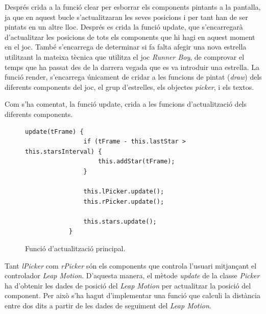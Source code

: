 \documentclass[12pt,a4paper,catalan]{article}
\begin{document}
	Després crida a la funció clear per esborrar els components pintants a la pantalla, ja que en aquest bucle s'actualitzaran les seves posicions i per tant han de ser pintats en un altre lloc.
	Després es crida la funció update, que s'encarregarà d'actualitzar les posicions de tots els components que hi hagi en aquest moment en el joc. També s'encarrega de determinar si fa falta afegir una nova estrella utilitzant la mateixa tècnica que utilitza el joc \textit{Runner Boy}, de comprovar el temps que ha passat des de la darrera vegada que es va introduir una estrella.
	La funció render, s'encarrega únicament de cridar a les funcions de pintat (\textit{draw}) dels diferents components del joc, el grup d'estrelles, els objectes \textit{picker}, i els textos.
	
	Com s'ha comentat, la funció update, crida a les funcions d'actualització dels diferents components.
	\begin{figure}[H]
		\begin{lstlisting}[gobble=12, tabsize=4]
			update(tFrame) {
				if (tFrame - this.lastStar > this.starsInterval) {
					this.addStar(tFrame);
				}
				
				this.lPicker.update();
				this.rPicker.update();
				
				this.stars.update();
			}
		\end{lstlisting}
		\caption{Funció d'actualització principal.}
		\label{fig:catch-stars-update}
	\end{figure}
	Tant \textit{lPicker} com \textit{rPicker} són els components que controla l'usuari mitjançant el controlador \textit{Leap Motion}. D'aquesta manera, el mètode \textit{update} de la classe \textit{Picker} ha d'obtenir les dades de posició del \textit{Leap Motion} per actualitzar la posició del component.
	Per això s'ha hagut d'implementar una funció que calculi la distància entre dos dits a partir de les dades de seguiment del \textit{Leap Motion}.
\end{document}
